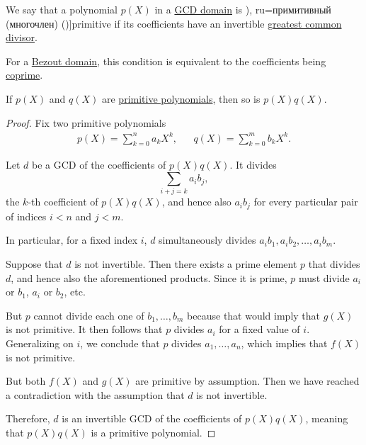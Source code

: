 \begin{definition}\label{def:primitive_polynomial}
  We say that a polynomial \( p(X) \) in a \hyperref[def:gcd_domain]{GCD domain} is \term[bg=примитивен (полином) (\cite[43]{ГеновИПр1991Алгебра}), ru=примитивный (многочлен) (\cite[124]{Винберг2014Алгебра})]{primitive} if its coefficients have an invertible \hyperref[def:gcd]{greatest common divisor}.
\end{definition}
\begin{comments}
  \item For a \hyperref[def:bezout_domain]{Bezout domain}, this condition is equivalent to the coefficients being \hyperref[def:coprime_elements]{coprime}.
\end{comments}

\begin{lemma}\label{thm:gauss_lemma}
  If \( p(X) \) and \( q(X) \) are \hyperref[def:primitive_polynomial]{primitive polynomials}, then so is \( p(X) q(X) \).
\end{lemma}
\begin{proof}
  Fix two primitive polynomials
  \begin{align*}
    p(X) = \sum_{k=0}^n a_k X^k,
    &&
    q(X) = \sum_{k=0}^m b_k X^k.
  \end{align*}

  Let \( d \) be a GCD of the coefficients of \( p(X) q(X) \). It divides
  \begin{equation*}
    \sum_{i+j=k} a_i b_j,
  \end{equation*}
  the \( k \)-th coefficient of \( p(X) q(X) \), and hence also \( a_i b_j \) for every particular pair of indices \( i < n \) and \( j < m \).

  In particular, for a fixed index \( i \), \( d \) simultaneously divides \( a_i b_1, a_i b_2, \ldots, a_i b_m \).

  Suppose that \( d \) is not invertible. Then there exists a prime element \( p \) that divides \( d \), and hence also the aforementioned products. Since it is prime, \( p \) must divide \( a_i \) or \( b_1 \), \( a_i \) or \( b_2 \), etc.

  But \( p \) cannot divide each one of \( b_1, \ldots, b_m \) because that would imply that \( g(X) \) is not primitive. It then follows that \( p \) divides \( a_i \) for a fixed value of \( i \). Generalizing on \( i \), we conclude that \( p \) divides \( a_1, \ldots, a_n \), which implies that \( f(X) \) is not primitive.

  But both \( f(X) \) and \( g(X) \) are primitive by assumption. Then we have reached a contradiction with the assumption that \( d \) is not invertible.

  Therefore, \( d \) is an invertible GCD of the coefficients of \( p(X) q(X) \), meaning that \( p(X) q(X) \) is a primitive polynomial.
\end{proof}

